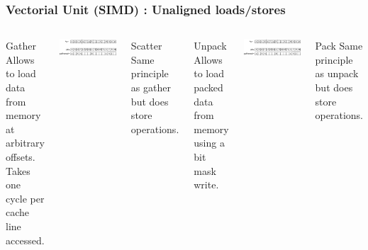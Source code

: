 \documentclass{beamer}
\begin{document}
\begin{frame}
  \frametitle{Vectorial Unit (SIMD) : Unaligned loads/stores}
  
  \begin{columns}

    \begin{block}{Gather}
      Allows to load data from memory at arbitrary offsets. Takes one
      cycle per cache line accessed.
    \end{block}
    
    \includegraphics[width=\linewidth]{slides-figures/gather.pdf}

    \begin{block}{Scatter}
      Same principle as gather but does store operations.
    \end{block}
    
  
    \begin{block}{Unpack}
      Allows to load packed data from memory using a bit mask write.
    \end{block}
    
    \includegraphics[width=\linewidth]{slides-figures/gather.pdf}

    \begin{block}{Pack}
      Same principle as unpack but does store operations.
    \end{block}    
  \end{columns}  
\end{frame}
\end{document}
